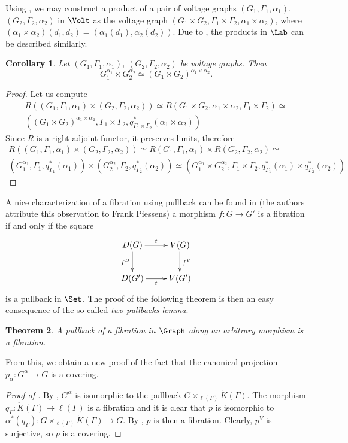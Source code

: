 \documentclass{amsart}
\newtheorem{theorem}{Theorem}[section]
\newtheorem{corollary}[theorem]{Corollary}
\theoremstyle{definition}
\newcommand{\KG}{{\mathring{K}(Γ)}}
\newcommand{\K}{\mathring{K}}
\newcommand{\lG}{{\ell(Γ)}}
\newcommand{\pb}[3]{{#1}×_{#2}{#3}}
\begin{document}
Using , we may construct a product of a pair of voltage
graphs $(G_1,Γ_1,α_1)$, $(G_2,Γ_2,α_2)$ in $\Volt$ as the voltage graph $(G_1×G_2,Γ_1×
Γ_2,α_1×α_2)$, where $(α_1×α_2)(d_1,d_2)=(α_1(d_1),α_2(d_2))$. Due to
, the products in $\Lab$ can be described similarly.
\begin{corollary}
Let $(G_1,Γ_1,α_1)$, $(G_2,Γ_2,α_2)$ be voltage graphs.
Then 
\[
G_1^{α_1}×G_2^{α_2}\simeq(G_1×G_2)^{α_1×α_2}.
\]
\end{corollary}
\begin{proof}
Let us compute
\begin{multline*}
R((G_1,Γ_1,α_1)×(G_2,Γ_2,α_2))\simeq 
R(G_1×G_2,α_1×α_2,Γ_1×Γ_2)\simeq\\
((G_1×G_2)^{α_1×α_2},Γ_1×Γ_2,q_{Γ_1×Γ_2}^*(α_1×α_2))
\end{multline*}
Since $R$ is a right adjoint functor, it preserves limits, therefore
\begin{multline*}
R((G_1,Γ_1,α_1)×(G_2,Γ_2,α_2))\simeq 
R(G_1,Γ_1,α_1)×R(G_2,Γ_2,α_2)\simeq\\
(G_1^{α_1},Γ_1,q_{Γ_1}^*(α_1))×(G_2^{α_2},Γ_2,q_{Γ_2}^*(α_2))\simeq
(G_1^{α_1}×G_2^{α_2},Γ_1×Γ_2,q_{Γ_1}^*(α_1)×q_{Γ_2}^*(α_2))
\end{multline*}
\end{proof}


A nice characterization of a fibration using pullback can be found in
\cite{boldi2002fibrations} (the authors attribute this observation to
Frank Piessens) a morphism $f\colon G\to G'$ is a fibration if and only if the
square
\[
\xymatrix{
D(G)
	\ar[r]^t
	\ar[d]_{f^D}
&
V(G)
	\ar[d]^{f^V}
\\
D(G')
	\ar[r]_t
&
V(G')
}
\]
is a pullback in $\Set$. The proof of the following theorem is then an
easy consequence of the so-called {\em two-pullbacks lemma}.
\begin{theorem}\cite[Theorem 45]{boldi2002fibrations}
\label{thm:fibrationpullback}
A pullback of a fibration in $\Graph$ along an arbitrary morphism is a fibration.
\end{theorem}

From this, we obtain a new proof of the fact that the canonical projection
$p_α\colon G^α\to G$ is a covering.

\begin{proof}[Proof of ]
By , $G^α$ is isomorphic to the pullback $\pb{G}{\lG}{\KG}$.
The morphism $q_Γ\colon\K(Γ)\to\ell(Γ)$ is a fibration
and it is clear that $p$ is isomorphic to $α^*(q_Γ)\colon\pb{G}{\lG}{\KG}\to G$. By ,
$p$ is then a fibration. Clearly, $p^V$ is surjective, so $p$ is a covering.
\end{proof}
\end{document}
